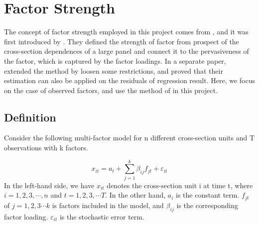 








		
%		
\section{Factor Strength}\label{strength}
The concept of factor strength employed in this project comes from , and it was first introduced by .
They defined the strength of factor from prospect of the cross-section dependences of a large panel and connect it to the pervasiveness of the factor, which is captured by the factor loadings.
In a separate paper,  extended the method by loosen some restrictions, and proved that their estimation can also be applied on the residuals of regression result.
Here, we focus on the case of observed factors, and use the method of  in this project.

		\subsection{Definition}\label{strength_definiton}

Consider the following multi-factor model for n different cross-section units and T observations with k  factors.

\[  x_{it} = a_{t}+  \sum_{j=1}^{k}\beta_{ij}f_{jt} + \varepsilon_{it} \tag{1}\label{definition_model} \]
In the left-hand side, we have $x_{it}$ denotes the cross-section unit i at time t, where $i = 1, 2,3, \cdots, n$ and $t = 1,2,3, \cdots T$.  
In the other hand, $a_{i}$ is the constant term.
$f_{jt}$ of $j = 1, 2, 3\cdots k$ is factors included in the model, and $\beta_{ij}$ is the corresponding factor loading.
$\varepsilon_{it}$ is the stochastic error term.


